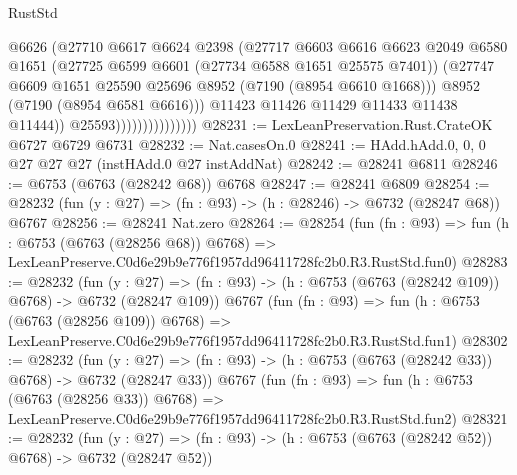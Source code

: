 \begin{lexlean}{RustStd}
\begin{coremodule}
                                    @6626
                                    (@27710
                                      @6617
                                      @6624
                                      @2398
                                      (@27717
                                        @6603
                                        @6616
                                        @6623
                                        @2049
                                        @6580
                                        @1651
                                        (@27725 @6599 @6601 (@27734 @6588 @1651 @25575 @7401))
                                        (@27747
                                          @6609
                                          @1651
                                          @25590
                                          @25696
                                          @8952
                                          (@7190 (@8954 @6610 @1668)))
                                        @8952
                                        (@7190 (@8954 @6581 @6616)))
                                      @11423
                                      @11426
                                      @11429
                                      @11433
                                      @11438
                                      @11444))
                                  @25593)))))))))))))))
@28231 := LexLeanPreservation.Rust.CrateOK @6727 @6729 @6731
@28232 := Nat.casesOn.{0}
@28241 := HAdd.hAdd.{0, 0, 0} @27 @27 @27 (instHAdd.{0} @27 instAddNat)
@28242 := @28241 @6811
@28246 := @6753 (@6763 (@28242 @68)) @6768
@28247 := @28241 @6809
@28254 := @28232 (fun (y : @27) => (fn : @93) -> (h : @28246) -> @6732 (@28247 @68)) @6767
@28256 := @28241 Nat.zero
@28264 := @28254
    (fun (fn : @93) =>
    fun (h : @6753 (@6763 (@28256 @68)) @6768) =>
    LexLeanPreserve.C0d6e29b9e776f1957dd96411728fc2b0.R3.RustStd.fun0)
@28283 := @28232
    (fun (y : @27) => (fn : @93) -> (h : @6753 (@6763 (@28242 @109)) @6768) -> @6732 (@28247 @109))
    @6767
    (fun (fn : @93) =>
    fun (h : @6753 (@6763 (@28256 @109)) @6768) =>
    LexLeanPreserve.C0d6e29b9e776f1957dd96411728fc2b0.R3.RustStd.fun1)
@28302 := @28232
    (fun (y : @27) => (fn : @93) -> (h : @6753 (@6763 (@28242 @33)) @6768) -> @6732 (@28247 @33))
    @6767
    (fun (fn : @93) =>
    fun (h : @6753 (@6763 (@28256 @33)) @6768) =>
    LexLeanPreserve.C0d6e29b9e776f1957dd96411728fc2b0.R3.RustStd.fun2)
@28321 := @28232
    (fun (y : @27) => (fn : @93) -> (h : @6753 (@6763 (@28242 @52)) @6768) -> @6732 (@28247 @52))

\end{coremodule}
\end{lexlean}
